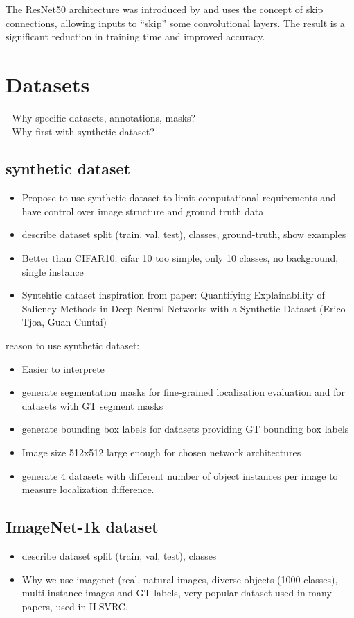 The ResNet50 architecture was introduced by \cite{he2016deep} and uses the concept of skip connections, allowing inputs to “skip” some convolutional layers. The result is a significant reduction in training time and improved accuracy.

\section{Datasets}
- Why specific datasets, annotations, masks?\\
- Why first with synthetic dataset?\\
\subsection{synthetic dataset}
\begin{itemize}
    \item Propose to use synthetic dataset to limit computational requirements and have control over image structure and ground truth data
    \item describe dataset split (train, val, test), classes, ground-truth, show examples
    \item Better than CIFAR10: cifar 10 too simple, only 10 classes, no background, single instance
    \item Syntehtic dataset inspiration from paper: Quantifying Explainability of Saliency Methods in Deep Neural Networks with a Synthetic Dataset (Erico Tjoa, Guan Cuntai)
\end{itemize}
reason to use synthetic dataset:
\begin{itemize}
    \item Easier to interprete
    \item generate segmentation masks for fine-grained localization evaluation and for datasets with GT segment masks
    \item generate bounding box labels for datasets providing GT bounding box labels
    \item Image size 512x512 large enough for chosen network architectures
    \item generate 4 datasets with different number of object instances per image to measure localization difference.
\end{itemize}

\subsection{ImageNet-1k dataset}
\begin{itemize}
    \item describe dataset split (train, val, test), classes
    \item Why we use imagenet (real, natural images, diverse objects (1000 classes), multi-instance images and GT labels, very popular dataset used in many papers, used in ILSVRC.
\end{itemize}

